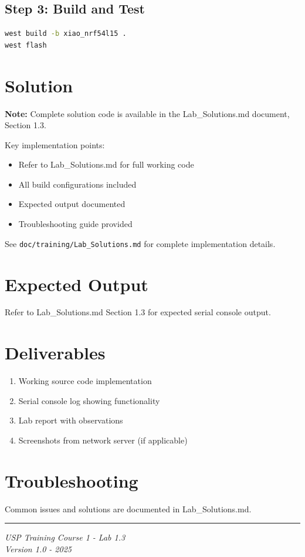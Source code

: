 \documentclass[11pt,a4paper]{article}
\begin{document}
\subsection{Step 3: Build and Test}
\begin{lstlisting}[language=bash]
west build -b xiao_nrf54l15 .
west flash
\end{lstlisting}

\section{Solution}

\begin{solutionbox}
\textbf{Note:} Complete solution code is available in the Lab\_Solutions.md document, Section 1.3.

Key implementation points:
\begin{itemize}
    \item Refer to Lab\_Solutions.md for full working code
    \item All build configurations included
    \item Expected output documented
    \item Troubleshooting guide provided
\end{itemize}

See \texttt{doc/training/Lab\_Solutions.md} for complete implementation details.
\end{solutionbox}

\section{Expected Output}

Refer to Lab\_Solutions.md Section 1.3 for expected serial console output.

\section{Deliverables}

\begin{enumerate}[itemsep=10pt]
    \item Working source code implementation
    \item Serial console log showing functionality
    \item Lab report with observations
    \item Screenshots from network server (if applicable)
\end{enumerate}

\section{Troubleshooting}

Common issues and solutions are documented in Lab\_Solutions.md.

\vfill
\noindent\rule{\textwidth}{0.4pt}
\begin{center}
\textit{USP Training Course 1 - Lab 1.3}\\
\textit{Version 1.0 - 2025}
\end{center}
\end{document}
